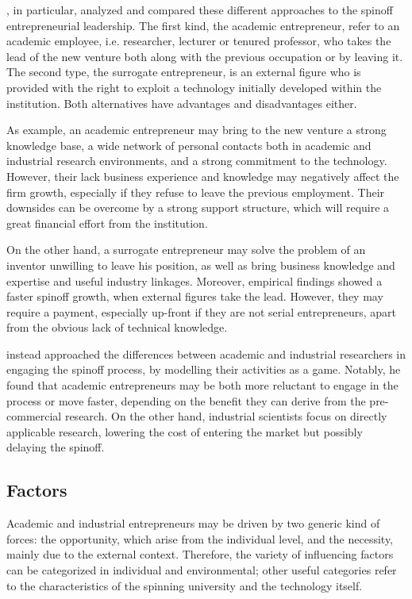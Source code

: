 \citet{Radosevich1955}, in particular, analyzed and compared these different approaches to the spinoff entrepreneurial leadership. The first kind, the academic entrepreneur, refer to an academic employee, i.e. researcher, lecturer or tenured professor, who takes the lead of the new venture both along with the previous occupation or by leaving it. The second type, the surrogate entrepreneur, is an external figure who is provided with the right to exploit a technology initially developed within the institution. Both alternatives have advantages and disadvantages either.

As example, an academic entrepreneur may bring to the new venture a strong knowledge base, a wide network of personal contacts both in academic and industrial research environments, and a strong commitment to the technology. However, their lack business experience and knowledge may negatively affect the firm growth, especially if they refuse to leave the previous employment. Their downsides can be overcome by a strong support structure, which will require a great financial effort from the institution. 

On the other hand, a surrogate entrepreneur may solve the problem of an inventor unwilling to leave his position, as well as bring business knowledge and expertise and useful industry linkages. Moreover, empirical findings showed a faster spinoff growth, when external figures take the lead. However, they may require a payment, especially up-front if they are not serial entrepreneurs, apart from the obvious lack of technical knowledge. 

\citet{Lacetera2006} instead approached the differences between academic and industrial researchers in engaging the spinoff process, by modelling their activities as a game. Notably, he found that academic entrepreneurs may be both more reluctant to engage in the process or move faster, depending on the benefit they can derive from the pre-commercial research. On the other hand, industrial scientists focus on directly applicable research, lowering the cost of entering the market but possibly delaying the spinoff.   

\subsection{Factors}

Academic and industrial entrepreneurs may be driven by two generic kind of forces: the opportunity, which arise from the individual level, and the necessity, mainly due to the external context. Therefore, the variety of influencing factors can be categorized in individual and environmental; other useful categories refer to the characteristics of the spinning university and the technology itself.

